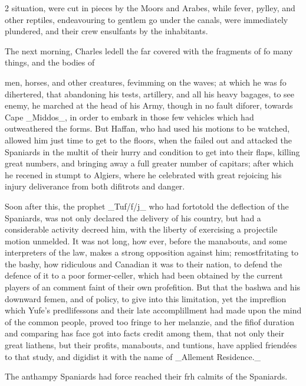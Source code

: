 \documentclass[10pt]{article}
\begin{document}
\begin{multicols}{2}
situation, were cut in pieces by the Moors and Arabes, while fever, pylley, and other reptiles, endeavouring to gentlem go under the canals, were immediately plundered, and their crew ensulfants by the inhabitants.

The next morning, Charles ledell the far covered with the fragments of fo many things, and the bodies of

men, horses, and other creatures, fevimming on the waves; at which he was fo dihertered, that abandoning his tests, artillery, and all his heavy bagages, to see enemy, he marched at the head of his Army, though in no fault diforer, towards Cape \_Middos\_, in order to embark in those few vehicles which had outweathered the forms. But Haffan, who had used his motions to be watched, allowed him just time to get to the floors, when the failed out and attacked the Spaniards in the multit of their hurry and condition to get into their flaps, killing great numbers, and bringing away a full greater number of capitars; after which he recened in stumpt to Algiers, where he celebrated with great rejoicing his injury deliverance from both difitrots and danger.

Soon after this, the prophet \_Tuf/f/j\_ who had fortotold the deflection of the Spaniards, was not only declared the delivery of his country, but had a considerable activity decreed him, with the liberty of exercising a projectile motion unmelded. It was not long, how ever, before the manabouts, and some interpreters of the law, makes a strong opposition against him; remostfritating to the bashy, how ridiculous and Canadian it was to their nation, to defend the defence of it to a poor former-celler, which had been obtained by the current players of an comment faint of their own profefition. But that the bashwa and his downward femen, and of policy, to give into this limitation, yet the impreflion which Yufe’s predlifessons and their late accomplillment had made upon the mind of the common people, proved too fringe to her melanzie, and the fifiof duration and comparing has face got into facts credit among them, that not only their great liathens, but their profits, manabouts, and tuntions, have applied friendées to that study, and digidist it with the name of \_Allement Residence.\_

The anthampy Spaniards had force reached their frh calmits of the Spaniards.


\end{multicols}
\end{document}
